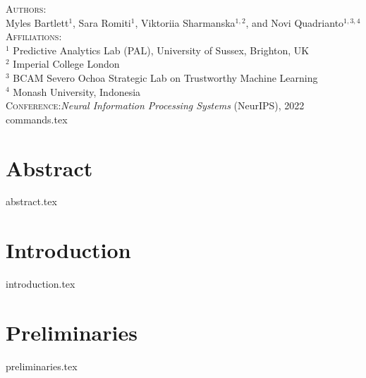 \textsc{Authors}:\\
Myles Bartlett$^1$, Sara Romiti$^1$, Viktoriia Sharmanska$^{1,2}$, and Novi Quadrianto$^{1,3,4}$ \\
\textsc{Affiliations}:\\
$^1$ Predictive Analytics Lab (PAL), University of Sussex, Brighton, UK\\
$^2$ Imperial College London \\
$^3$ BCAM Severo Ochoa Strategic Lab on Trustworthy Machine Learning \\
$^4$ Monash University, Indonesia \\
\textsc{Conference}:\;\;\textit{Neural Information Processing Systems} (NeurIPS), 2022 \\

{commands.tex}


% 




\section{Abstract}
\noindent
{abstract.tex}

\section{Introduction}\label{sec:intro}
{introduction.tex}


\section{Preliminaries}\label{sec:prelims}
{preliminaries.tex}

